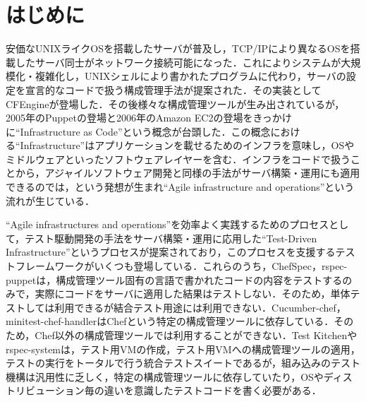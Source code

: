 \section{はじめに}

安価なUNIXライクOSを搭載したサーバが普及し，TCP/IPにより異なるOSを搭載したサーバ同士がネットワーク接続可能になった．これによりシステムが大規模化・複雑化し，UNIXシェルにより書かれたプログラムに代わり，サーバの設定を宣言的なコードで扱う構成管理手法が提案された．その実装としてCFEngine\cite{cfengine}が登場した．その後様々な構成管理ツールが生み出されているが\cite{cmt}，2005年のPuppetの登場\cite{puppet}と2006年のAmazon EC2の登場\cite{ec2}をきっかけに``Infrastructure as Code''という概念が台頭した．この概念における``Infrastructure''はアプリケーションを載せるためのインフラを意味し，OSやミドルウェアといったソフトウェアレイヤーを含む．インフラをコードで扱うことから，アジャイルソフトウェア開発\cite{agile_manifesto}と同様の手法がサーバ構築・運用にも適用できるのでは，という発想が生まれ``Agile infrastructure and operations''\cite{agile_infrastructure}という流れが生じている．

``Agile infrastructures and operations''を効率よく実践するためのプロセスとして，テスト駆動開発\cite{test_driven_development}の手法をサーバ構築・運用に応用した``Test-Driven Infrastructure''\cite{test_driven_infrastructure_with_chef}というプロセスが提案されており，このプロセスを支援するテストフレームワークがいくつも登場している\cite{chefspec}\cite{rspec-puppet}\cite{cucumber-chef}\cite{minitest-chef-handler}\cite{test-kitchen}\cite{rspec-system}．これらのうち，ChefSpec\cite{chefspec}，rspec-puppet\cite{rspec-puppet}は，構成管理ツール固有の言語で書かれたコードの内容をテストするのみで，実際にコードをサーバに適用した結果はテストしない．そのため，単体テストしては利用できるが結合テスト用途には利用できない．Cucumber-chef\cite{cucumber-chef}，minitest-chef-handler\cite{minitest-chef-handler}はChefという特定の構成管理ツールに依存している．そのため，Chef以外の構成管理ツールでは利用することができない．Test Kitchen\cite{test-kitchen}やrspec-system\cite{rspec-system}は，テスト用VMの作成，テスト用VMへの構成管理ツールの適用，テストの実行をトータルで行う統合テストスイートであるが，組み込みのテスト機構は汎用性に乏しく，特定の構成管理ツールに依存していたり，OSやディストリビューション毎の違いを意識したテストコードを書く必要がある．

